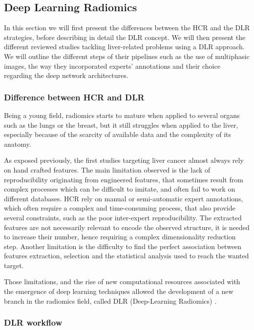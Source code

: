 \documentclass[]{article}
\begin{document}
\subsection{Deep Learning Radiomics}\label{deep-learning-radiomics}

In this section we will first present the differences between the
HCR and the DLR strategies, before describing in detail
the DLR concept. We will then present the different reviewed
studies tackling liver-related problems using a DLR approach. We
will outline the different steps of their pipelines such as the use of
multiphasic images, the way they incorporated experts' annotations and
their choice regarding the deep network architectures.

\subsubsection{Difference between HCR and
DLR}\label{difference-between-hcr-and-dlr}

Being a young field, radiomics starts to mature when applied to several
organs such as the lungs or the breast, but it still struggles when
applied to the liver, especially because of the scarcity of available
data and the complexity of its anatomy.

As exposed previously, the first studies targeting liver cancer almost
always rely on hand crafted features.
The main limitation observed is the lack of reproducibility originating
from engineered features, that sometimes result from complex processes
which can be difficult to imitate, and often fail to work on different
databases.
HCR rely on manual or semi-automatic expert annotations, which
often require a complex and time-consuming process, that also provide
several constraints, such as the poor inter-expert reproducibility.
The extracted features are not necessarily relevant to encode the
observed structure, it is needed to increase their number, hence
requiring a complex dimensionality reduction step.
Another limitation is the difficulty to find the perfect association
between features extraction, selection and the statistical analysis used
to reach the wanted target.

Those limitations, and the rise of new computational resources
associated with the emergence of deep learning techniques allowed the
development of a new branch in the radiomics field, called DLR
(Deep-Learning Radiomics) \cite{Afshar2018}.

\subsubsection{DLR workflow}\label{dlr-workflow}
\end{document}

